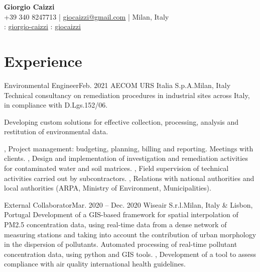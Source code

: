 \documentclass[letterpaper,11pt]{article}
\begin{document}
\begin{center}
  \textbf{\Huge \bfseries Giorgio Caizzi} \\
  \vspace{3pt}
  \small +39 340 8247713 | \href{mailto:giocaizzi@gmail.com}{\underline{giocaizzi@gmail.com}}
  | Milan, Italy\\
  \vspace{3pt}
  \faLinkedinSquare{} : \href{https://linkedin.com/in/giorgio-caizzi/}{\underline{giorgio-caizzi}}
  \faGithubSquare{} : \href{https://www.github.com/giocaizzi/}{\underline{giocaizzi}}\\
\end{center}
\vspace{-30pt}

\section{Experience}
\sectionElementListStart

\sectionElement
{Environmental Engineer}{Feb. 2021}
{AECOM URS Italia S.p.A.}{Milan, Italy}
{
  Technical consultancy on remediation procedures in industrial sites across Italy, in compliance with D.Lgs.152/06.
}
{
  {
      Developing custom solutions for effective collection, processing, analysis and restitution of environmental data.

    },
  {
      Project management: budgeting, planning, billing and reporting. Meetings with clients.
    },
  {
      Design and implementation of investigation and remediation activities for contaminated water and soil matrices.
    },
  {
      Field supervision of technical activities carried out by subcontractors.
    },
  {
      Relations with national authorities and local authorities  (ARPA, Ministry of Environment, Municipalities).
    }
}


\sectionElement
{External Collaborator}{Mar. 2020 -- Dec. 2020}
{Wiseair S.r.l.}{Milan, Italy \& Lisbon, Portugal}
{
  Development of a GIS-based framework for spatial interpolation of PM2.5 concentration
  data, using real-time data from a dense network of measuring stations and taking into account the contribution of
  urban morphology in the dispersion of pollutants.
}
{
  {
      Automated processing of real-time pollutant concentration data, using python and GIS tools.
    },
  {
      Development of a tool to assess compliance with air quality international health guidelines.
    }
}
\end{document}
